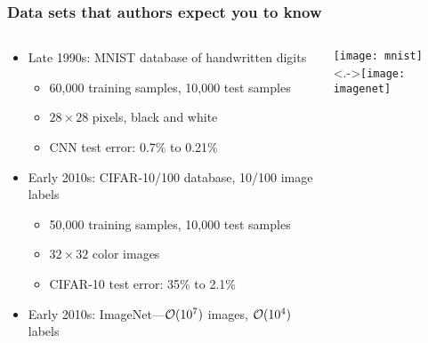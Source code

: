 \begin{frame}
    \frametitle{Data sets that authors expect you to know}
    \begin{columns}
        \begin{column}{0.55\textwidth}
            \begin{itemize}
                \item<+-> Late 1990s: MNIST database of handwritten digits
                \begin{itemize}
                    \item 60,000 training samples, 10,000 test samples
                    \item $28 \times 28$ pixels, black and white
                    \item CNN test error: 0.7\% \citep[``LeNet-5'',][]{LeCunIEEE98} to 0.21\% \citep{WanICML13}
                \end{itemize}
                \item<+-> Early 2010s: CIFAR-10/100 database, 10/100 image labels
                \begin{itemize}
                    \item 50,000 training samples, 10,000 test samples
                    \item $32 \times 32$ color images
                    \item CIFAR-10 test error: 35\% \citep{RanzatoAISTATS10} to 2.1\% \citep{Real18}
                \end{itemize}
                \item<+-> Early 2010s: ImageNet---$\mathcal{O}(10^7)$ images, $\mathcal{O}(10^4)$ labels
            \end{itemize}
        \end{column}
        \begin{column}{0.45\textwidth}
            \texttt{[image: mnist]} \\[5mm]
            \visible<.->{\texttt{[image: imagenet]}}
        \end{column}
    \end{columns}
\end{frame}

